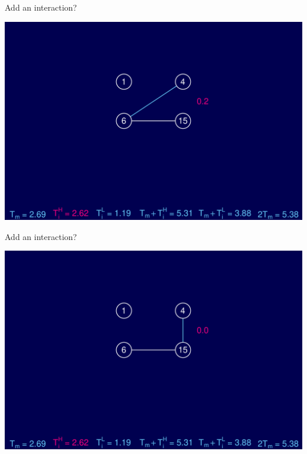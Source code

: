 \documentclass[12pt]{article}
\newcommand{\headsize}{\fontsize{35}{35} \selectfont}
\begin{document}
\newpage

\addtocounter{page}{-1}

\headsize \color{myyellow}
\hfill \begin{minipage}{5.75in}
\centering
Add an interaction?
\end{minipage}

\vfill


\centerline{\includegraphics{FigsB/hyper_models7.pdf}}



\newpage

\addtocounter{page}{-1}

\headsize \color{myyellow}
\hfill \begin{minipage}{5.75in}
\centering
Add an interaction?
\end{minipage}

\vfill


\centerline{\includegraphics{FigsB/hyper_models8.pdf}}
\end{document}
